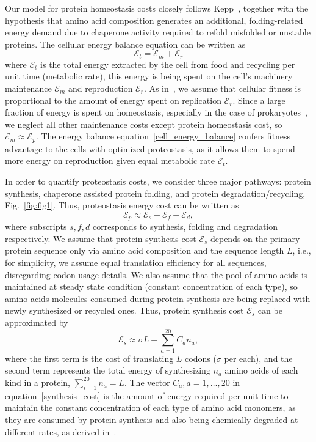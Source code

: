 \documentclass[10pt,letterpaper]{article}
\begin{document}
Our model for protein homeostasis costs closely follows Kepp~\cite{Kepp2014Model}, together with the hypothesis that amino acid composition generates an additional, folding-related energy demand due to chaperone activity required to refold misfolded or unstable proteins. The cellular energy balance equation can be written as
\begin{equation}
	\label{cell_energy_balance}
	\mathcal{E}_{t} = \mathcal{E}_{m} + \mathcal{E}_{r}
\end{equation}
where $\mathcal{E}_{t}$ is the total energy extracted by the cell from food and recycling per unit time (metabolic rate), this energy is being spent on the cell's machinery maintenance $\mathcal{E}_{m}$ and reproduction $\mathcal{E}_{r}$. As in~\cite{Kepp2014Model}, we assume that cellular fitness is proportional to the amount of energy spent on replication $\mathcal{E}_{r}$.  Since a large fraction of energy is spent on homeostasis, especially in the case of prokaryotes~\cite{Harold1987Vital}, we neglect all other maintenance costs except protein homeostasis cost, so $\mathcal{E}_{m}\approx\mathcal{E}_{p}$.
The energy balance equation~\eqref{cell_energy_balance} confers fitness advantage to the cells with optimized proteostasis, as it allows them to spend more energy on reproduction given equal metabolic rate $\mathcal{E}_{t}$. 

In order to quantify proteostasis costs, we consider three major pathways: protein synthesis, chaperone assisted protein folding, and protein degradation/recycling,  Fig.~\ref{fig:fig1}. Thus, proteostasis energy cost can be written as
\begin{equation}
	\label{proteostasis_cost_expansion}
	\mathcal{E}_{p} \approx \mathcal{E}_{s} + \mathcal{E}_{f} + \mathcal{E}_{d},
\end{equation}
where subscripts $s,f,d$ corresponds to synthesis, folding and degradation respectively. We assume that protein synthesis cost $\mathcal{E}_{s}$ depends on the primary protein sequence only via amino acid composition and the sequence length $L$, i.e., for simplicity, we assume equal translation efficiency for all sequences, disregarding codon usage details. We also assume that the pool of amino acids is maintained at steady state condition (constant concentration of each type), so amino acids molecules consumed during protein synthesis are being replaced with newly synthesized or recycled ones. Thus, protein synthesis cost $\mathcal{E}_{s}$ can be approximated by
\begin{equation}
	\label{synthesis_cost}
	\mathcal{E}_{s} \approx \sigma L + \sum\limits_{a=1}^{20}C_{a}n_{a},
\end{equation}
where the first term is the cost of translating $L$ codons ($\sigma$ per each), and the second term represents the total energy of synthesizing $n_{a}$ amino acids of each kind in a protein, $\sum\limits_{i=1}^{20}n_{a} = L$. The vector $C_{a}, a=1,\dots,20$ in equation~\eqref{synthesis_cost} is the amount of energy required per unit time to maintain the constant concentration of each type of amino acid monomers, as they are consumed by protein synthesis and also being chemically degraded at different rates, as derived in~\cite{Krick2014Amino}. 
 
\end{document}
